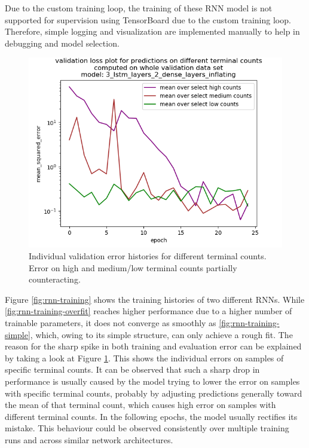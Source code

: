 Due to the custom training loop, the training of these \gls{RNN} model is not supported for supervision using TensorBoard due to the custom training loop. Therefore, simple logging and visualization are implemented manually to help in debugging and model selection.

\begin{figure}
	\includegraphics[width=\linewidth]{plots/rnn-training-history-individual-3_lstm_layers_2_dense_layers_inflating.png}
	\caption{Individual validation error histories for different terminal counts. Error on high and medium/low terminal counts partially counteracting.}
	\label{fig:rnn-training-individual}
\end{figure}

Figure \ref{fig:rnn-training} shows the training histories of two different \glspl{RNN}. While \ref{fig:rnn-training-overfit} reaches higher performance due to a higher number of trainable parameters, it does not converge as smoothly as \ref{fig:rnn-training-simple}, which, owing to its simple structure, can only achieve a rough fit. The reason for the sharp spike in both training and evaluation error can be explained by taking a look at Figure \ref{fig:rnn-training-individual}. This shows the individual errors on samples of specific terminal counts. It can be observed that such a sharp drop in performance is usually caused by the model trying to lower the error on samples with specific terminal counts, probably by adjusting predictions generally toward the mean of that terminal count, which causes high error on samples with different terminal counts. In the following epochs, the model usually rectifies its mistake. This behaviour could be observed consistently over multiple training runs and across similar network architectures.


